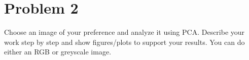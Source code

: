 \documentclass{article}
\begin{document}
%
%
%
%

\section*{Problem 2 }
Choose an image of your preference and analyze it using PCA. Describe your work step by step and show figures/plots to support your results. You can do either an RGB or greyscale image.
\end{document}
